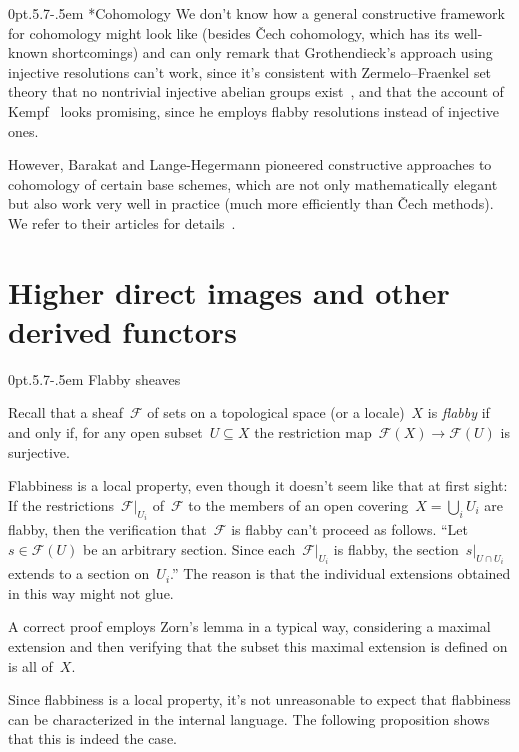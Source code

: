 \documentclass[10pt,reqno,a4paper]{amsbook}
\makeatletter
\theoremstyle{definition}
\theoremstyle{plain}
\theoremstyle{remark}
\newcommand{\F}{\mathcal{F}}
\newcommand{\?}{\,{:}\,}
\renewcommand{\_}{\mathpunct{.}\,}
\def\subsection{\@startsection{subsection}{2}%
  {0pt}{.5\linespacing\@plus.7\linespacing}{-.5em}%
  {\normalfont\bfseries}}
\makeatother
\begin{document}
{\subsection*{Cohomology} We don't know how a general constructive framework for
cohomology might look like (besides Čech cohomology, which has its well-known
shortcomings) and can only remark that Grothendieck's approach using injective
resolutions can't work, since it's consistent with Zermelo--Fraenkel set theory
that no nontrivial injective abelian groups exist~\cite{blass:inj-proj-axc},
and that the account of Kempf~\cite{kempf:cohomology} looks promising, since he
employs flabby resolutions instead of injective ones.

However, Barakat and Lange-Hegermann pioneered constructive approaches to
cohomology of certain base schemes, which are not only mathematically elegant
but also work very well in practice (much more efficiently than Čech methods).
We refer to their articles for details~\cite{barakat-lh:homalg,barakat-lh:ext}.

}


\section{Higher direct images and other derived functors}

\subsection{Flabby sheaves}

Recall that a sheaf~$\F$ of sets on a topological space (or a locale)~$X$ is
\emph{flabby} if and only if, for any open subset~$U \subseteq X$ the
restriction map~$\F(X) \to \F(U)$ is surjective.

Flabbiness is a local property, even though it doesn't seem like that
at first sight: If the restrictions~$\F|_{U_i}$ of~$\F$ to the members of an
open covering~$X = \bigcup_i U_i$ are flabby, then the verification that~$\F$ is
flabby can't proceed as follows. ``Let~$s \in \F(U)$ be an arbitrary section.
Since each~$\F|_{U_i}$ is flabby, the section~$s|_{U \cap U_i}$ extends to a
section on~$U_i$.'' The reason is that the individual extensions obtained in
this way might not glue.

A correct proof employs Zorn's lemma in a typical way, considering a maximal
extension and then verifying that the subset this maximal extension is defined
on is all of~$X$.

Since flabbiness is a local property, it's not unreasonable to expect that
flabbiness can be characterized in the internal language. The following
proposition shows that this is indeed the case.
\end{document}
